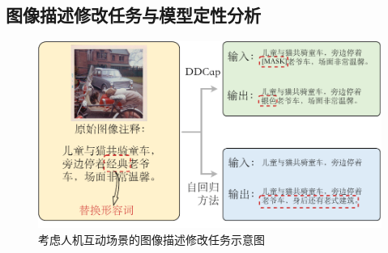 \begin{table}
\begin{tabular}{lcccccc}
    \bottomrule
  \end{tabular}
  \label{tab:ddcap-compsota}
\end{table}


\subsection{图像描述修改任务与模型定性分析}

\begin{figure}
  \centering
  \includegraphics[width=0.8\linewidth]{figures/ddcap-modification-task.pdf}
  \caption{考虑人机互动场景的图像描述修改任务示意图}
  \label{fig:ddcap-modification-task}
\end{figure}


